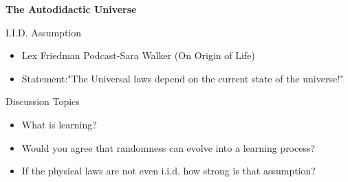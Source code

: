 \documentclass[aspectratio=169]{beamer}
\author{\authorlabel}
\newcommand{\mysubtitle}{\color{Pink}\Large{\textbf{The Autodidactic Universe}}}
\renewcommand{\cite}[1]{\footnote<.->[frame]{\fullcite{#1}}}
\begin{document}


\begin{frame}
  \centering
  \mysubtitle
\end{frame}

\begin{frame}{I.I.D. Assumption}
  \centering
  \begin{itemize}
    \item Lex Friedman Podcast-Sara Walker (On Origin of Life)
    \item Statement:"The Universal laws depend on the current state of the universe!" 
  \end{itemize}
      
\end{frame}



\begin{frame}{Discussion Topics}
  \begin{itemize}
    \item What is learning? 
    \item Would you agree that randomness can evolve into a learning process?
    \item If the physical laws are not even i.i.d. how strong is that assumption?
  \end{itemize}
\end{frame}
\end{document}
